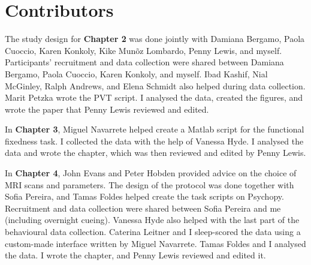 \markboth{}{}
\chapter*{Contributors}
\label{chapter:Contributors}
The study design for \textbf{Chapter 2} was done jointly with Damiana Bergamo, Paola Cuoccio, Karen Konkoly, Kike Munõz Lombardo, Penny Lewis, and myself. Participants' recruitment and data collection were shared between Damiana Bergamo, Paola Cuoccio, Karen Konkoly, and myself. Ibad Kashif, Nial McGinley, Ralph Andrews, and Elena Schmidt also helped during data collection. Marit Petzka wrote the PVT script. I analysed the data, created the figures, and wrote the paper that Penny Lewis reviewed and edited. 

In \textbf{Chapter 3}, Miguel Navarrete helped create a Matlab script for the functional fixedness task. I collected the data with the help of Vanessa Hyde. I analysed the data and wrote the chapter, which was then reviewed and edited by Penny Lewis.

In \textbf{Chapter 4}, John Evans and Peter Hobden provided advice on the choice of MRI scans and parameters. The design of the protocol was done together with Sofia Pereira, and Tamas Foldes helped create the task scripts on Psychopy. Recruitment and data collection were shared between Sofia Pereira and me (including overnight cueing). Vanessa Hyde also helped with the last part of the behavioural data collection. Caterina Leitner and I sleep-scored the data using a custom-made interface written by Miguel Navarrete. Tamas Foldes and I analysed the data. I wrote the chapter, and Penny Lewis reviewed and edited it.
